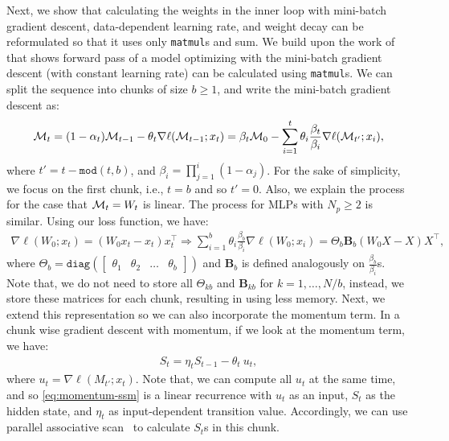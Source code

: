 Next, we show that calculating the weights in the inner loop with mini-batch gradient descent, data-dependent learning rate, and weight decay can be reformulated so that it uses only \texttt{matmul}s and sum. We build upon the work of \citet{sun2024learning} that shows forward pass of a model optimizing with the mini-batch gradient descent (with constant learning rate) can be calculated using \texttt{matmul}s. We can split the sequence into chunks of size $b \geq 1$, and write the mini-batch gradient descent as:
\begin{align}
    \mathcal{M}_{t} = (1 - \alpha_t) \mathcal{M}_{t-1} - \theta_t \nabla \ell(\mathcal{M}_{t-1}; x_t) = \beta_{t} \mathcal{M}_0 - \sum_{i = 1}^{t} \theta_i \frac{\beta_{t}}{\beta_{i}} \nabla \ell(\mathcal{M}_{t'}; x_i),
\end{align}
where $t' = t - \texttt{mod}(t, b)$, and $\beta_{i} = \prod_{j=1}^{i}(1-\alpha_j)$. For the sake of simplicity, we focus on the first chunk, i.e., $t = b$ and so $t' = 0$. Also, we explain the process for the case that $\mathcal{M}_{t} = W_t$ is linear. The process for MLPs with $N_p \geq 2$ is similar. Using our loss function, we have:
\begin{align}\label{eq:weight-decay-matmul}
    \nabla \ell(W_{0}; x_t) =  (W_0 x_t - x_t) x_t^{\top} \Rightarrow \sum_{i = 1}^{b} \theta_i \frac{\beta_{b}}{\beta_{i}} \nabla \ell(W_{0}; x_i) = \Theta_b \mathbf{B}_b (W_0 X - X) X^{\top}, 
\end{align}
where $\Theta_b = \texttt{diag}\left(\begin{bmatrix}
    \theta_1 & \theta_2 & \dots & \theta_b
\end{bmatrix} \right)$ and $\mathbf{B}_b$ is defined analogously on $\frac{\beta_{b}}{\beta_{i}}$s. Note that, we do not need to store all $\Theta_{kb}$ and $\mathbf{B}_{kb}$ for $k = 1, \dots, N/b$, instead, we store these matrices for each chunk, resulting in using less memory. Next, we extend this representation so we can also incorporate the momentum term. In a chunk wise gradient descent with momentum, if we look at the momentum term, we have:
\begin{align}\label{eq:momentum-ssm}
    S_{t} = \eta_t {S_{t-1}} - \theta_t\:  u_t,
\end{align}
where $u_t = \nabla \ell\left(M_{t'}; x_{t} \right)$. Note that, we can compute all $u_t$ at the same time, and so \autoref{eq:momentum-ssm} is a linear recurrence with $u_t$ as an input, $S_t$ as the hidden state, and $\eta_t$ as input-dependent transition value. Accordingly, we can use parallel associative scan~\citep{smith2023simplified} to calculate $S_t$s in this chunk.  



